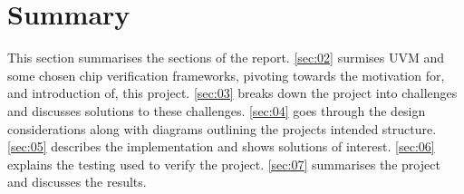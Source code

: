 \section{Summary}\label{sec:01}
This section summarises the sections of the report.\newline
\cref{sec:02} surmises UVM and some chosen chip verification frameworks, pivoting towards the motivation for, and introduction of, this project.\newline
\cref{sec:03} breaks down the project into challenges and discusses solutions to these challenges.\newline
\cref{sec:04} goes through the design considerations along with diagrams outlining the projects intended structure.\newline
\cref{sec:05} describes the implementation and shows solutions of interest.\newline
\cref{sec:06} explains the testing used to verify the project.\newline
\cref{sec:07} summarises the project and discusses the results.\newline